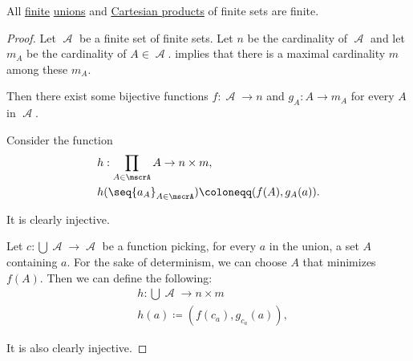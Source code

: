 \begin{proposition}\label{thm:finite_unions_and_products_are_finite}
  All \hyperref[def:aleph_zero_related_cardinalities]{finite} \hyperref[def:set_union]{unions} and \hyperref[def:cartesian_product]{Cartesian products} of finite sets are finite.
\end{proposition}
\begin{proof}
  Let \( \mscrA \) be a finite set of finite sets. Let \( n \) be the cardinality of \( \mscrA \) and let \( m_A \) be the cardinality of \( A \in \mscrA \).  implies that there is a maximal cardinality \( m \) among these \( m_A \).

  Then there exist some bijective functions \( f: \mscrA \to n \) and \( g_A: A \to m_A \) for every \( A \) in \( \mscrA \).

   Consider the function
  \begin{equation*}
    \begin{aligned}
      &h: \prod_{A \in \mscrA} A \to n \times m, \\
      &h(\seq{ a_A }_{A \in \mscrA}) \coloneqq (f(A), g_A(a)).
    \end{aligned}
  \end{equation*}

  It is clearly injective.

   Let \( c: \bigcup \mscrA \to \mscrA \) be a function picking, for every \( a \) in the union, a set \( A \) containing \( a \). For the sake of determinism, we can choose \( A \) that minimizes \( f(A) \). Then we can define the following:
  \begin{equation*}
    \begin{aligned}
      &h: \bigcup \mscrA \to n \times m \\
      &h(a) \coloneqq (f(c_a), g_{c_a}(a)),
    \end{aligned}
  \end{equation*}

  It is also clearly injective.
\end{proof}

